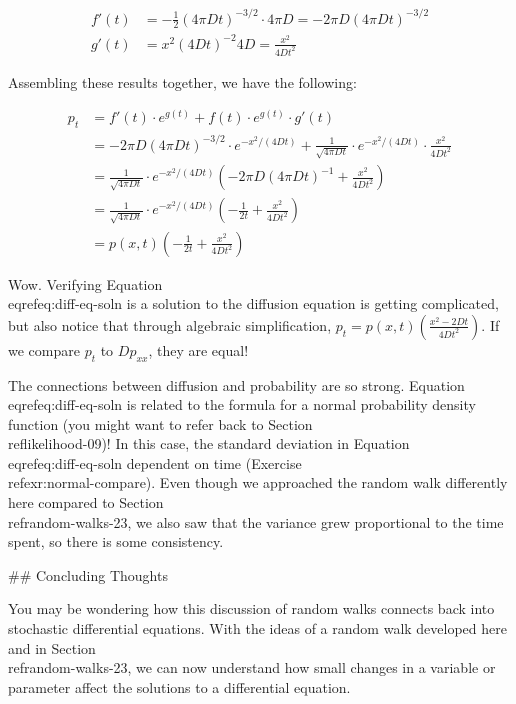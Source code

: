 \documentclass[
]{book}
\theoremstyle{definition}
\theoremstyle{definition}
\theoremstyle{definition}
\theoremstyle{remark}
\begin{document}
\begin{align*}
f'(t) &= -\frac{1}{2} (4 \pi D t)^{-3/2} \cdot 4 \pi D = -2\pi D (4 \pi D t)^{-3/2}  \\
g'(t) &= x^{2} (4Dt)^{-2} 4D = \frac{x^{2}}{4Dt^{2}}
\end{align*}

Assembling these results together, we have the following: 

\begin{align*}
p_{t} &= f'(t) \cdot e^{g(t)} + f(t) \cdot e^{g(t)} \cdot g'(t) \\
&= -2\pi D (4 \pi D t)^{-3/2} \cdot e^{-x^{2}/(4 D t)}  + \frac{1}{\sqrt{4 \pi Dt} } \cdot e^{-x^{2}/(4 D t)} \cdot \frac{x^{2}}{4Dt^{2}} \\
&= \frac{1}{\sqrt{4 \pi Dt} } \cdot e^{-x^{2}/(4 D t)} \left( -2 \pi D (4 \pi D t)^{-1} +  \frac{x^{2}}{4Dt^{2}} \right) \\
&= \frac{1}{\sqrt{4 \pi Dt} } \cdot e^{-x^{2}/(4 D t)} \left( -\frac{1}{2t} +  \frac{x^{2}}{4Dt^{2}} \right) \\
&= p(x,t)  \left( -\frac{1}{2t} +  \frac{x^{2}}{4Dt^{2}} \right)
\end{align*}


Wow.  Verifying Equation \\eqref{eq:diff-eq-soln} is a solution to the diffusion equation is getting complicated, but also notice that through algebraic simplification, $\displaystyle p_{t} = p(x,t)  \left(\frac{x^{2}-2Dt}{4Dt^{2}} \right)$.  If we compare $p_{t}$ to $D p_{xx}$, they are equal!


 The connections between diffusion and probability are so strong. Equation \\eqref{eq:diff-eq-soln} is related to the formula for a normal probability density function (you might want to refer back to Section \\ref{likelihood-09})! In this case, the standard deviation in Equation \\eqref{eq:diff-eq-soln} dependent on time (Exercise \\ref{exr:normal-compare}). Even though we approached the random walk differently here compared to Section \\ref{random-walks-23}, we also saw that the variance grew proportional to the time spent, so there is some consistency.
 
## Concluding Thoughts

You may be wondering how this discussion of random walks connects back into stochastic differential equations.  With the ideas of a random walk developed here and in Section \\ref{random-walks-23}, we can now understand how small changes in a variable or parameter affect the solutions to a differential equation.
\end{document}
